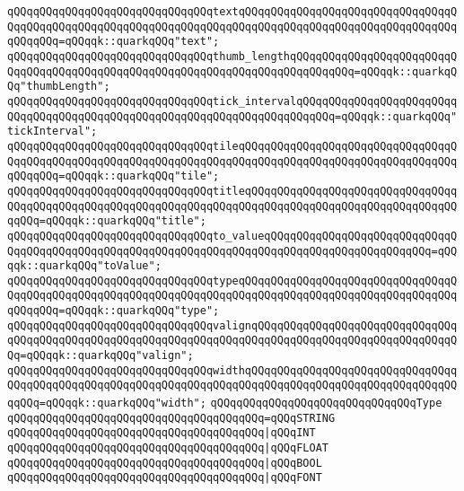 \verb|qQQqqQQqqQQqqQQqqQQqqQQqqQQqqQQqtextqQQqqQQqqQQqqQQqqQQqqQQqqQQqqQQqqQQqqQQqqQQqqQQqqQQqqQQqqQQqqQQqqQQqqQQqqQQqqQQqqQQqqQQqqQQqqQQqqQQqqQQqqQQqqQQq=qQQqqk::quarkqQQq"text";|\newline
\verb|qQQqqQQqqQQqqQQqqQQqqQQqqQQqqQQqthumb_lengthqQQqqQQqqQQqqQQqqQQqqQQqqQQqqQQqqQQqqQQqqQQqqQQqqQQqqQQqqQQqqQQqqQQqqQQqqQQqqQQq=qQQqqk::quarkqQQq"thumbLength";|\newline
\verb|qQQqqQQqqQQqqQQqqQQqqQQqqQQqqQQqtick_intervalqQQqqQQqqQQqqQQqqQQqqQQqqQQqqQQqqQQqqQQqqQQqqQQqqQQqqQQqqQQqqQQqqQQqqQQqqQQq=qQQqqk::quarkqQQq"tickInterval";|\newline
\verb|qQQqqQQqqQQqqQQqqQQqqQQqqQQqqQQqtileqQQqqQQqqQQqqQQqqQQqqQQqqQQqqQQqqQQqqQQqqQQqqQQqqQQqqQQqqQQqqQQqqQQqqQQqqQQqqQQqqQQqqQQqqQQqqQQqqQQqqQQqqQQqqQQq=qQQqqk::quarkqQQq"tile";|\newline
\verb|qQQqqQQqqQQqqQQqqQQqqQQqqQQqqQQqtitleqQQqqQQqqQQqqQQqqQQqqQQqqQQqqQQqqQQqqQQqqQQqqQQqqQQqqQQqqQQqqQQqqQQqqQQqqQQqqQQqqQQqqQQqqQQqqQQqqQQqqQQqqQQq=qQQqqk::quarkqQQq"title";|\newline
\verb|qQQqqQQqqQQqqQQqqQQqqQQqqQQqqQQqto_valueqQQqqQQqqQQqqQQqqQQqqQQqqQQqqQQqqQQqqQQqqQQqqQQqqQQqqQQqqQQqqQQqqQQqqQQqqQQqqQQqqQQqqQQqqQQqqQQq=qQQqqk::quarkqQQq"toValue";|\newline
\verb|qQQqqQQqqQQqqQQqqQQqqQQqqQQqqQQqtypeqQQqqQQqqQQqqQQqqQQqqQQqqQQqqQQqqQQqqQQqqQQqqQQqqQQqqQQqqQQqqQQqqQQqqQQqqQQqqQQqqQQqqQQqqQQqqQQqqQQqqQQqqQQqqQQq=qQQqqk::quarkqQQq"type";|\newline
\verb|qQQqqQQqqQQqqQQqqQQqqQQqqQQqqQQqvalignqQQqqQQqqQQqqQQqqQQqqQQqqQQqqQQqqQQqqQQqqQQqqQQqqQQqqQQqqQQqqQQqqQQqqQQqqQQqqQQqqQQqqQQqqQQqqQQqqQQqqQQq=qQQqqk::quarkqQQq"valign";|\newline
\verb|qQQqqQQqqQQqqQQqqQQqqQQqqQQqqQQqwidthqQQqqQQqqQQqqQQqqQQqqQQqqQQqqQQqqQQqqQQqqQQqqQQqqQQqqQQqqQQqqQQqqQQqqQQqqQQqqQQqqQQqqQQqqQQqqQQqqQQqqQQqqQQq=qQQqqk::quarkqQQq"width";|\newline
\newline
\verb|qQQqqQQqqQQqqQQqqQQqqQQqqQQqqQQqType|\newline
\verb|qQQqqQQqqQQqqQQqqQQqqQQqqQQqqQQqqQQqqQQq=qQQqSTRING|\newline
\verb|qQQqqQQqqQQqqQQqqQQqqQQqqQQqqQQqqQQqqQQq|\verb#|qQQqINT#\newline
\verb|qQQqqQQqqQQqqQQqqQQqqQQqqQQqqQQqqQQqqQQq|\verb#|qQQqFLOAT#\newline
\verb|qQQqqQQqqQQqqQQqqQQqqQQqqQQqqQQqqQQqqQQq|\verb#|qQQqBOOL#\newline
\verb|qQQqqQQqqQQqqQQqqQQqqQQqqQQqqQQqqQQqqQQq|\verb#|qQQqFONT#\newline
